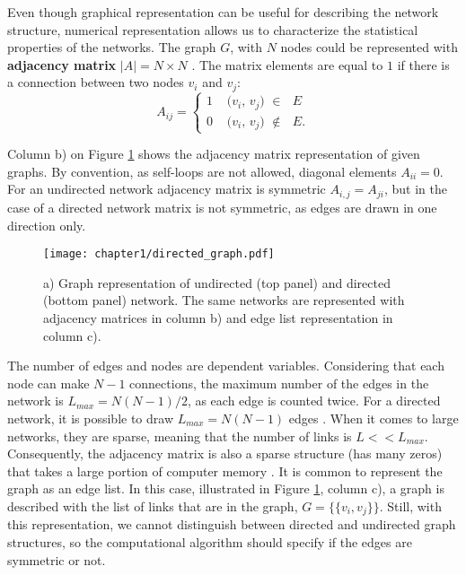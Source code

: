 Even though graphical representation can be useful for describing the network structure, numerical representation allows us to characterize the statistical properties of the networks. The graph $G$, with $N$ nodes could be represented with \textbf{adjacency matrix} $|A| = N \times N$ \cite{boccaletti2006complex}. The matrix elements are equal to $1$ if there is a connection between two nodes $v_i$ and $v_j$:
\begin{equation}
A_{ij} =
\begin{cases}
1 & \text{ ($v_i$, $v_j$) $\in$ $E$}\\
0 & \text{ ($v_i$, $v_j$) $\notin$ $E$}.
\end{cases}       
\end{equation}

Column b) on Figure \ref{fig:graph_dir} shows the adjacency matrix representation of given graphs. By convention, as self-loops are not allowed, diagonal elements $A_{ii}=0$. For an undirected network adjacency matrix is symmetric $A_{i,j}=A_{ji}$, but in the case of a directed network matrix is not symmetric, as edges are drawn in one direction only.  

\begin{figure}[h]
	\centering
	\texttt{[image: chapter1/directed\_graph.pdf]} 
	\caption[Graph, matrix and edge list representations.]{a) Graph representation of undirected (top panel) and directed (bottom panel) network. The same networks are represented with adjacency matrices in column b) and edge list representation in column c).}
	\label{fig:graph_dir}
\end{figure}

The number of edges and nodes are dependent variables. Considering that each node can make $N-1$ connections, the maximum number of the edges in the network is $L_{max}=N(N-1)/2$, as each edge is counted twice. For a directed network, it is possible to draw $L_{max}=N(N-1)$ edges \cite{caldarelli2007scalefree}. When it comes to large networks, they are sparse, meaning that the number of links is $L<<L_{max}$. Consequently, the adjacency matrix is also a sparse structure (has many zeros) that takes a large portion of computer memory \cite{barabasi2016network}. 
It is common to represent the graph as an edge list. In this case, illustrated in Figure \ref{fig:graph_dir}, column c), a graph is described with the list of links that are in the graph, $G = \{ \{v_i,v_j\}\}$. Still, with this representation, we cannot distinguish between directed and undirected graph structures, so the computational algorithm should specify if the edges are symmetric or not.  

